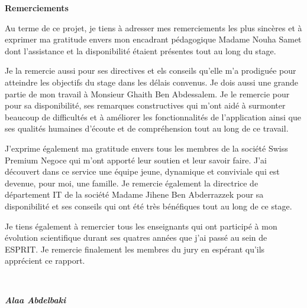 \thispagestyle{empty}
\begin{center}
    \begin{huge}
        \textbf{Remerciements}
    \end{huge}
\end{center}
\vspace{2cm}
\begin{small}
    \justifying


    Au terme de ce projet, je tiens à adresser mes remerciements les plus sincères et à exprimer ma gratitude envers mon encadrant pédagogique Madame Nouha Samet dont l'assistance et la disponibilité étaient présentes tout au long du stage.


    Je la remercie aussi pour ses directives et els conseils qu'elle m'a prodiguée pour atteindre les objectifs du stage dans les délais convenus.
    Je dois aussi une grande partie de mon travail à Monsieur Ghaith Ben Abdessalem. Je le remercie pour pour sa disponibilité, ses remarques constructives qui m'ont aidé à surmonter beaucoup de difficultés et à améliorer les fonctionnalités de l'application ainsi que ses qualités humaines d'écoute et de compréhension tout au long de ce travail.


    J'exprime également ma gratitude envers tous les membres de la société Swiss Premium Negoce qui m'ont apporté leur soutien et leur savoir faire. J'ai découvert dans ce service une équipe jeune, dynamique et conviviale qui est devenue, pour moi, une famille. Je remercie également la directrice de département IT de la société Madame Jihene Ben Abderrazzek pour sa disponibilité et ses conseils qui ont été très bénéfiques tout au long de ce stage.


    Je tiens également à remercier tous les enseignants qui ont participé à mon évolution scientifique durant ses quatres années que j'ai passé au sein de ESPRIT. Je remercie finalement les membres du jury en espérant qu'ils apprécient ce rapport.
\end{small} \\
\bigbreak
\begin{flushright}
    \textbf{\textit{Alaa Abdelbaki}}
\end{flushright}